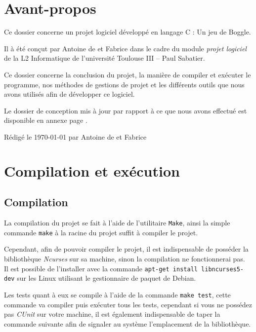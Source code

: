 \documentclass[12pt,a4paper,openany]{book}
\let\pagebreakORIG\pagebreak
\let\clearpageORIG\clearpage
\let\cleardoublepageORIG\cleardoublepage
\newcommand{\restorepagebreak}{\renewcommand{\pagebreak}{\pagebreakORIG}\renewcommand{\clearpage}{\clearpageORIG}\renewcommand{\cleardoublepage}{\cleardoublepageORIG}}
\begin{document}
	\setcounter{tocdepth}{1}
	\setcounter{secnumdepth}{3}
	\maketitle
	\chapter*{Avant-propos}
	Ce dossier concerne un projet logiciel développé en langage C : Un jeu de Boggle.

	Il à été conçut par Antoine de  et Fabrice  dans le cadre du module \textit{projet logiciel} de la L2 Informatique de l'université Toulouse III -- Paul Sabatier.

	Ce dossier concerne la conclusion du projet, la manière de compiler et exécuter le programme, nos méthodes de gestions de projet
	et les différents outils que nous avons utilisés afin de développer ce logiciel.


	Le dossier de conception mis à jour par rapport à ce que nous avons effectué est disponible en annexe page \pageref{conception}.

	\tableofcontents
	\vfill
	\footnotesize Rédigé le \today{} par Antoine de  et Fabrice 
	\restorepagebreak
	\chapter{Compilation et exécution}
	\section{Compilation}
	La compilation du projet se fait à l'aide de l'utilitaire \texttt{Make}, ainsi la simple
	commande \texttt{make} à la racine du projet suffit à compiler le projet.

	Cependant, afin de pouvoir compiler le projet, il est indispensable de posséder la
	bibliothèque \textit{Ncurses} sur sa machine, sinon la compilation ne fonctionnerai pas.\\ 
	Il est possible de l'installer avec la commande \texttt{apt-get install libncurses5-dev}
	sur les Linux utilisant le gestionnaire de paquet de Debian.

	Les tests quant à eux se compile à l'aide de la commande \texttt{make test}, cette
	commande va compiler puis exécuter tous les tests, cependant si vous ne possédez pas
	\textit{CUnit} sur votre machine, il est également indispensable de taper la commande
	suivante afin de signaler au système l'emplacement de la bibliothèque.
\end{document}
